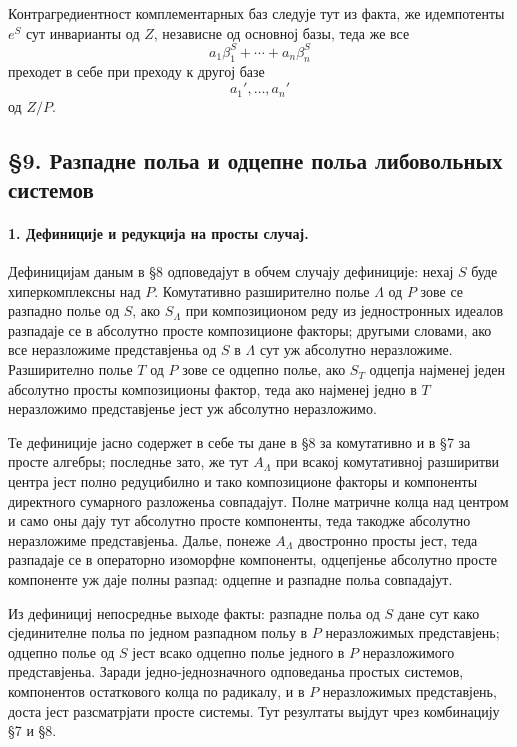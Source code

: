 ﻿\documentclass[11pt]{article}
\begin{document}
Контрагредиентност комплементарных баз следује тут из факта, же идемпотенты \(e^S\) сут инварианты од \(Z\), независне од основној базы, теда же все
\[
        a_1\beta_1^S+\cdots+a_n\beta_n^S
\]
преходет в себе при преходу к другој базе
\[
        a_1',\ldots,a_n'
\]
од \(Z/P\).

\subsection*{§9. Разпадне польа и одцепне польа либовольных системов}

\paragraph{1. Дефиниције и редукција на просты случај.}
Дефиницијам даным в §8 одповедајут в обчем случају дефиниције: нехај \(S\) буде хиперкомплексны над \(P\). Комутативно разширително полье \(\Lambda\) од \(P\) зове се разпадно полье од \(S\), ако \(S_\Lambda\) при композиционом реду из једностронных идеалов разпадаје се в абсолутно просте композиционе факторы; другыми словами, ако все неразложиме представјеньа од \(S\) в \(\Lambda\) сут уж абсолутно неразложиме. Разширително полье \(T\) од \(P\) зове се одцепно полье, ако \(S_T\) одцепја најменеј једен абсолутно просты композиционы фактор, теда ако најменеј једно в \(T\) неразложимо представјенье јест уж абсолутно неразложимо.

Те дефиниције јасно содержет в себе ты дане в §8 за комутативно и в §7 за просте алгебры; последнье зато, же тут \(A_\Lambda\) при всакој комутативној разширитви центра јест полно редуцибилно и тако композиционе факторы и компоненты директного сумарного разложеньа совпадајут. Полне матричне колца над центром и само оны дају тут абсолутно просте компоненты, теда такодже абсолутно неразложиме представјеньа. Далье, понеже \(A_\Lambda\) двостронно просты јест, теда разпадаје се в операторно изоморфне компоненты, одцепјенье абсолутно просте компоненте уж даје полны разпад: одцепне и разпадне польа совпадајут.

Из дефинициј непосреднье выходе факты: разпадне польа од \(S\) дане сут како сјединителне польа по једном разпадном польу в \(P\) неразложимых представјень; одцепно полье од \(S\) јест всако одцепно полье једного в \(P\) неразложимого представјеньа. Заради једно-једнозначного одповеданьа простых системов, компонентов остаткового колца по радикалу, и в \(P\) неразложимых представјень, доста јест разсматрјати просте системы. Тут резултаты выјдут чрез комбинацију §7 и §8.
\end{document}

